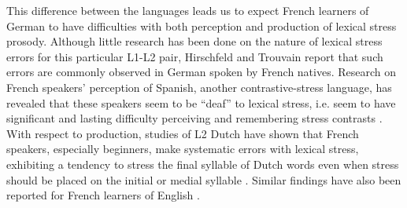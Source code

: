 \documentclass[a4paper]{article}
\begin{document}
This difference between the languages leads us to expect French learners of German to have difficulties with both perception and production of lexical stress prosody.
Although little research has been done on the nature of lexical stress errors for this particular L1-L2 pair, Hirschfeld and Trouvain \cite{Hirschfeld2007} report that such errors are commonly observed in German spoken by French natives.
Research on French speakers' perception of Spanish, another contrastive-stress language, has revealed that these speakers seem to be ``deaf'' to lexical stress, i.e. seem to have significant and lasting difficulty perceiving and remembering stress contrasts \cite{Dupoux2008}. 
With respect to production, studies of L2 Dutch have shown that French speakers, especially beginners, make systematic errors with lexical stress, exhibiting a tendency to stress the final syllable of Dutch words even when stress should be placed on the initial or medial syllable \cite{Michaux2012,Michaux2013}. Similar findings have also been reported for French learners of English \cite{Bonneau2011}.
\end{document}
